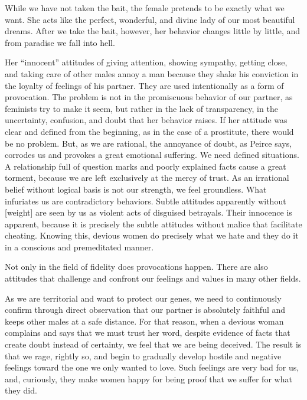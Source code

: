 \par While we have not taken the bait, the female pretends to be exactly what we want. She acts like the perfect, wonderful, and divine lady of our most beautiful dreams. After we take the bait, however, her behavior changes little by little, and from paradise we fall into hell.

\par Her \enquote{innocent} attitudes of giving attention, showing sympathy, getting close, and taking care of other males annoy a man because they shake his conviction in the loyalty of feelings of his partner. They are used intentionally as a form of provocation. The problem is not in the promiscuous behavior of our partner, as feminists try to make it seem, but rather in the lack of transparency, in the uncertainty, confusion, and doubt that her behavior raises. If her attitude was clear and defined from the beginning, as in the case of a prostitute, there would be no problem. But, as we are rational, the annoyance of doubt, as Peirce says, corrodes us and provokes a great emotional suffering. We need defined situations. A relationship full of question marks and poorly explained facts cause a great torment, because we are left exclusively at the mercy of trust. As an irrational belief without logical basis is not our strength, we feel groundless. What infuriates us are contradictory behaviors. Subtle attitudes apparently without [weight] are seen by us as violent acts of disguised betrayals. Their innocence is apparent, because it is precisely the subtle attitudes without malice that facilitate cheating. Knowing this, devious women do precisely what we hate and they do it in a conscious and premeditated manner.

\par Not only in the field of fidelity does provocations happen. There are also attitudes that challenge and confront our feelings and values in many other fields.

\par As we are territorial and want to protect our genes, we need to continuously confirm through direct observation that our partner is absolutely faithful and keeps other males at a safe distance. For that reason, when a devious woman complains and says that we must trust her word, despite evidence of facts that create doubt instead of certainty, we feel that we are being deceived. The result is that we rage, rightly so, and begin to gradually develop hostile and negative feelings toward the one we only wanted to love. Such feelings are very bad for us, and, curiously, they make women happy for being proof that we suffer for what they did.

